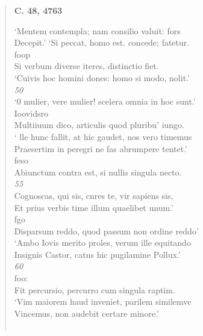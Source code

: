 \documentclass[11pt, a4paper]{report}
\begin{document}
\begin{verse}
    \begin{center} \textbf{C. 48, 4763} \end{center} \marginpar{[10]} ‘Mentem contempla; nam consilio valuit: fors \\ Decepit.’ ‘Si peccat, homo est. concede; fatetur. \\ foop \\ Si verbum diverse iteres, distinctio fiet. \\ ‘Cuivis hoc homini dones: homo si modo, nolit.’ \\ \textit{50} \\ ‘0 mulier, vere mulier! scelera omnia in hoc sunt.’ \\ Ioovidsro \\ Multiiuum dico, articulis quod pluribu’ iungo. \\ ‘ \lbrack lle hunc fallit, at hic gaudet, nos vero timemus \\ Praesertim in peregri ne fas abrumpere tentet.’ \\ feso \\ Abiunctum contra est, si nullis singula necto. \\ \textit{55} \\ Cognoscas, qui sis, cnres te, vir sapiens sis, \\ Et prius verbis time illum quaelibet unum.’ \\ fgo \\ Disparsum reddo, quod passum non ordine reddo’ \\ ‘Ambo Iovis merito proles, verum ille equitando \\ Insignis Castor, catns hic pugilamine Pollux.’ \\ \textit{60} \\ foo: \\ Fit percursio, percurro cum singula raptim. \\ ‘Vim maiorem haud inveniet, parilem similemve \\ Vincemus, non audebit certare minore.’ \\ 
        ﻿\pagebreak 

\end{verse}
\end{document}
